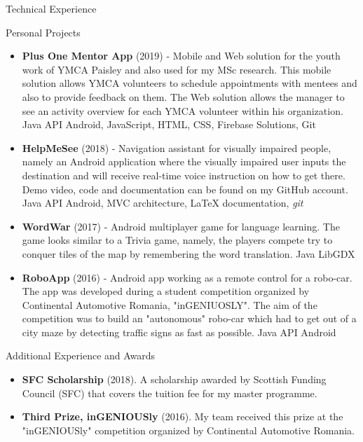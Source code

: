 \documentclass[]{mcdowellcv}
\begin{document}
	\begin{cvsection}{Technical Experience}
		\begin{cvsubsection}{Personal Projects}{}{}
			\begin{itemize}
				\item \textbf{Plus One Mentor App} (2019) - Mobile and Web solution for the youth work of YMCA Paisley and also used for my MSc research. This mobile solution allows YMCA volunteers to schedule appointments with mentees and also to provide feedback on them. The Web solution allows the manager to see an activity overview for each YMCA volunteer within his organization. Java API Android, JavaScript, HTML, CSS, Firebase Solutions, Git
				\item \textbf{HelpMeSee} (2018) - Navigation assistant for visually impaired people, namely an Android application where the visually impaired user inputs the destination and will receive real-time voice instruction on how to get there. Demo video, code and documentation can be found on my GitHub account. Java API Android, MVC architecture, LaTeX documentation, \textit{git} 
				\item \textbf{WordWar} (2017) - Android multiplayer game for language learning. The game looks similar to a Trivia game, namely, the players compete try to conquer tiles of the map by remembering the word translation. Java LibGDX 
				\item \textbf{RoboApp} (2016) - Android app working as a remote control for a robo-car. The app was developed during a student competition organized by Continental Automotive Romania, "inGENIUOSLY". The aim of the competition was to build an "autonomous" robo-car which had to get out of a city maze by detecting traffic signs as fast as possible. Java API Android
			\end{itemize}
		\end{cvsubsection}
	\end{cvsection}
	
	\begin{cvsection}{Additional Experience and Awards}
		\begin{cvsubsection}{}{}{}	
			\begin{itemize}
				\item \textbf{SFC Scholarship} (2018). A scholarship awarded by Scottish Funding Council (SFC) that covers the tuition fee for my master programme.
				\item \textbf{Third Prize, inGENIOUSly} (2016). My team received this prize at the "inGENIOUSly" competition organized by Continental Automotive Romania. 
			\end{itemize}
		\end{cvsubsection}
	\end{cvsection}
\end{document}
